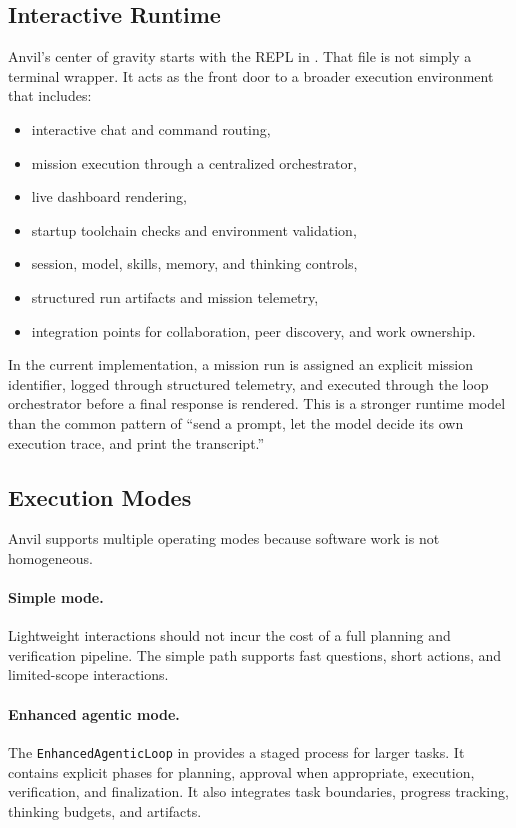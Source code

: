 \documentclass[11pt,a4paper]{article}
\begin{document}
\subsection{Interactive Runtime}
Anvil's center of gravity starts with the REPL in . That file is not simply a terminal wrapper. It acts as the front door to a broader execution environment that includes:
\begin{itemize}
    \item interactive chat and command routing,
    \item mission execution through a centralized orchestrator,
    \item live dashboard rendering,
    \item startup toolchain checks and environment validation,
    \item session, model, skills, memory, and thinking controls,
    \item structured run artifacts and mission telemetry,
    \item integration points for collaboration, peer discovery, and work ownership.
\end{itemize}

In the current implementation, a mission run is assigned an explicit mission identifier, logged through structured telemetry, and executed through the loop orchestrator before a final response is rendered. This is a stronger runtime model than the common pattern of ``send a prompt, let the model decide its own execution trace, and print the transcript.''

\subsection{Execution Modes}
Anvil supports multiple operating modes because software work is not homogeneous.

\paragraph{Simple mode.}
Lightweight interactions should not incur the cost of a full planning and verification pipeline. The simple path supports fast questions, short actions, and limited-scope interactions.

\paragraph{Enhanced agentic mode.}
The \texttt{EnhancedAgenticLoop} in  provides a staged process for larger tasks. It contains explicit phases for planning, approval when appropriate, execution, verification, and finalization. It also integrates task boundaries, progress tracking, thinking budgets, and artifacts.
\end{document}
